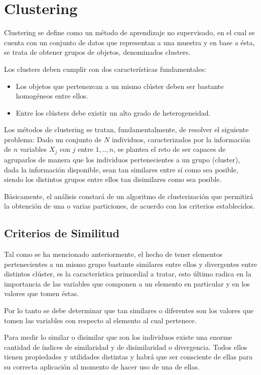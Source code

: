 \section{Clustering}

Clustering se define como un método de aprendizaje no supervisado, en el cual se cuenta con un conjunto de datos que representan a una muestra y en base a ésta, se trata de obtener grupos de objetos, denominados clusters.

Los clusters deben cumplir con dos características fundamentales:

\begin{itemize}
	\item Los objetos que pertenezcan a un mismo clúster deben ser bastante homogéneos entre ellos.
	\item Entre los clústers debe existir un alto grado de heterogeneidad.
\end{itemize}

Los métodos de clustering se tratan, fundamentalmente, de resolver el siguiente problema: Dado un conjunto de $N$ individuos, caracterizados por la información de $n$ variables $X_{j}$ con $j$ entre $1,..,n$, se plantea el reto de ser capaces de agruparlos de manera que los individuos pertenecientes a un grupo (cluster), dada la información disponible, sean tan similares entre sí como sea posible, siendo los distintos grupos entre ellos tan disimilares como sea posible.

Básicamente, el análisis constará de un algoritmo de clusterización que permitirá la obtención de una o varias particiones, de acuerdo con los criterios establecidos.

\subsection{Criterios de Similitud}

Tal como se ha mencionado anteriormente, el hecho de tener elementos pertenecientes a un mismo grupo bastante similares entre ellos y divergentes entre distintos clúster, es la característica primordial a tratar, esto último radica en la importancia de las variables que componen a un elemento en particular y en los valores que tomen éstas.

Por lo tanto se debe determinar que tan similares o diferentes son los valores que tomen las variables con respecto al elemento al cual pertenece.

Para medir lo similar o disimilar que son los individuos existe una enorme cantidad de índices de similaridad y de disimilaridad o divergencia. Todos ellos tienen propiedades y utilidades distintas y habrá que ser consciente de ellas para su correcta aplicación al momento de hacer uso de una de ellas.

